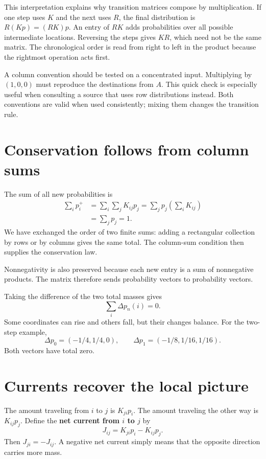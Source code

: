 \documentclass[11pt,oneside,openany]{book}
\theoremstyle{definition}
\theoremstyle{remark}
\numberwithin{equation}{chapter}
\begin{document}
This interpretation explains why transition matrices compose by multiplication. If one step uses \(K\) and the next uses \(R\), the final distribution is \(R(Kp)=(RK)p\). An entry of \(RK\) adds probabilities over all possible intermediate locations. Reversing the steps gives \(KR\), which need not be the same matrix. The chronological order is read from right to left in the product because the rightmost operation acts first.

A column convention should be tested on a concentrated input. Multiplying by \((1,0,0)\) must reproduce the destinations from \(A\). This quick check is especially useful when consulting a source that uses row distributions instead. Both conventions are valid when used consistently; mixing them changes the transition rule.

\section{Conservation follows from column sums}\label{ch04-conservation-follows-from-column-sums}

The sum of all new probabilities is \[\begin{aligned}
\sum_i p_i^+
&=\sum_i\sum_j K_{ij}p_j
=\sum_j p_j\left(\sum_i K_{ij}\right)\\
&=\sum_j p_j=1.
\end{aligned}\] We have exchanged the order of two finite sums: adding a rectangular collection by rows or by columns gives the same total. The column-sum condition then supplies the conservation law.

Nonnegativity is also preserved because each new entry is a sum of nonnegative products. The matrix therefore sends probability vectors to probability vectors.

Taking the difference of the two total masses gives \[\sum_i\Delta p_n(i)=0.\] Some coordinates can rise and others fall, but their changes balance. For the two-step example, \[\Delta p_0=(-1/4,1/4,0),\qquad
\Delta p_1=(-1/8,1/16,1/16).\] Both vectors have total zero.

\section{Currents recover the local picture}\label{ch04-currents-recover-the-local-picture}

The amount traveling from \(i\) to \(j\) is \(K_{ji}p_i\). The amount traveling the other way is \(K_{ij}p_j\). Define the \textbf{net current from \(i\) to \(j\)} by \[J_{ij}=K_{ji}p_i-K_{ij}p_j.\] Then \(J_{ji}=-J_{ij}\). A negative net current simply means that the opposite direction carries more mass.
\end{document}

